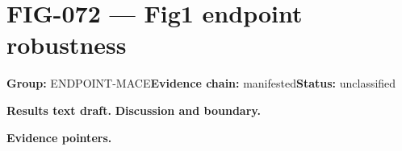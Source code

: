 \clearpage
\section{FIG-072 --- Fig1 endpoint robustness}
\label{figpage:fig-072}
\textbf{Group:} ENDPOINT-MACE\quad \textbf{Evidence chain:} manifested\quad \textbf{Status:} unclassified

\textbf{Results text draft.} 
\textbf{Discussion and boundary.} 


\textbf{Evidence pointers.}



\vfill
